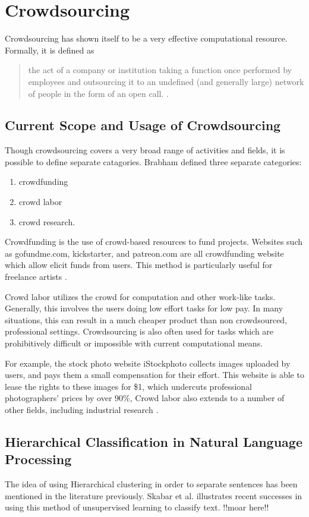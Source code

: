 
\section{Crowdsourcing}
Crowdsourcing has shown itself to be a very effective computational resource.
Formally, it is defined as
\begin{quote}
the act of a company or institution taking a function once performed by employees and outsourcing it to an undefined (and generally large) network of people in the form of an open call. \cite{brabham2008crowdsourcing}.
\end{quote}

\subsection{Current Scope and Usage of Crowdsourcing}
Though crowdsourcing covers a very broad range of activities and fields, it is possible to define separate catagories. Brabham defined three separate categories:
\begin{enumerate}
	\item crowdfunding
	\item crowd labor 
	\item crowd research.
\end{enumerate} 

Crowdfunding is the use of crowd-based resources to fund projects. Websites such as gofundme.com, kickstarter, and patreon.com are all crowdfunding website which allow elicit funds from users. 
This method is particularly useful for freelance artists \cite{brabham2008crowdsourcing}.

Crowd labor utilizes the crowd for computation and other work-like tasks. Generally, this involves the users doing low effort tasks for low pay. 
In many situations, this can result in a much cheaper product than non crowdsourced, professional settings.
Crowdsourcing is also often used for tasks which are prohibitively difficult or impossible with current computational means.

For example, the stock photo website iStockphoto collects images uploaded by users, and pays them a small compensation for their effort. 
This website is able to lease the rights to these images for \$1, which undercuts professional photographers' prices by over $90\%$, Crowd labor also extends to a number of other fields, including industrial research \cite{howe2006rise}.

\subsection{Hierarchical Classification in Natural Language Processing}
The idea of using Hierarchical clustering in order to separate sentences has been mentioned in the literature previously. 
Skabar et al. illustrates recent successes in using this method of unsupervised learning to classify text. !!moar here!!

